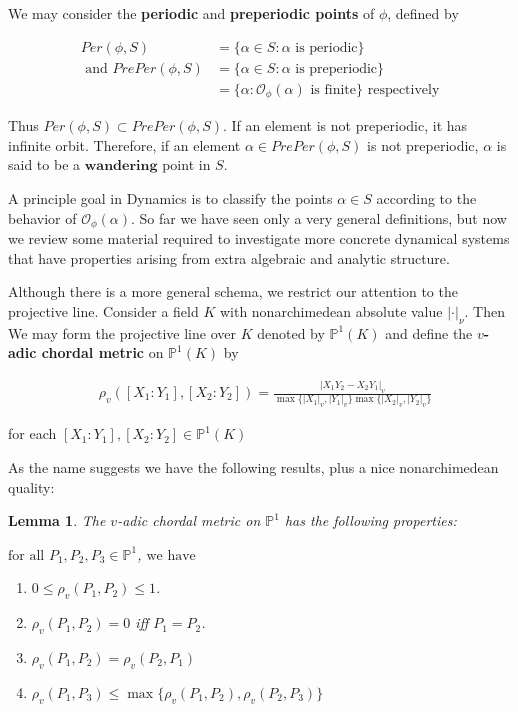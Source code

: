 \documentclass{amsart}
\newtheorem{lem}[thm]{Lemma}
\newcommand{\sbs}{\subset}
\renewcommand{\P}{\mathbb{P}}
\begin{document}
We may consider the \textbf{periodic} and  \textbf{preperiodic points} of $\phi$, defined by 

\begin{align*}
Per(\phi,S) 
&= \{\alpha \in S: \alpha \text{ is periodic}\} \\ \text{ and }PrePer(\phi,S) 
&= \{\alpha \in S: \alpha \text{ is preperiodic}\} \\ 
& = \{\alpha:\mathcal{O}_{\phi}(\alpha) \text{ is finite}\}  \text{ respectively}
\end{align*}

Thus $Per(\phi,S) \sbs PrePer(\phi,S)$. If an element is not preperiodic, it has infinite orbit. Therefore, if an element $\alpha \in PrePer(\phi,S)$ is not preperiodic, $\alpha$  is said to be a $\textbf{wandering}$ point in $S$.

A principle goal in Dynamics is to classify the points $\alpha \in S$ according to the behavior of $\mathcal{O}_\phi(\alpha)$. So far we have seen only a very general definitions, but now we review some material required to investigate more concrete dynamical systems that have properties arising from extra algebraic and analytic structure. 

Although there is a more general schema, we restrict our attention to the projective line. Consider a field $K$ with nonarchimedean absolute value $|\cdot|_{\nu}$. Then We may form the projective line over $K$ denoted by $\P^{1}(K)$ and define the {\boldmath$v$}\textbf{-adic chordal metric} on $\P^{1}(K)$ by 

\begin{align*}
&\rho_{v}([X_{1}:Y_{1}],[X_{2}:Y_{2}]) = \frac{|X_{1}Y_{2} - X_{2}Y_{1}|_{v}}{\max\{|X_{1}|_{v},|Y_{1}|_{v}\}\max\{|X_{2}|_{v},|Y_{2}|_{v}\}} 
\end{align*} 

\noindent for each $[X_{1}: Y_{1}],[X_{2}: Y_{2}] \in \P^{1}(K)$


As the name suggests we have the following results, plus a nice nonarchimedean quality:

\begin{lem}
The $v$-adic chordal metric on $\P^{1}$ has the following properties: 

$\text{for all }P_{1}, P_{2}, P_{3} \in \P^{1}$, $\text{we have}$

\begin{enumerate}
\item $ 0 \leq \rho_{v}(P_{1},P_{2}) \leq 1$.  
\item $\rho_{v}(P_{1},P_{2}) = 0$ iff $P_{1} = P_2$.
\item $\rho_{v}(P_{1},P_{2}) = \rho_{v}(P_{2},P_{1})$
\item $\rho_{v}(P_{1},P_{3}) \leq \max\{\rho_{v}(P_{1},P_{2}), \rho_{v}(P_{2},P_{3})\}$
\end{enumerate}

\end{lem}
\end{document}
